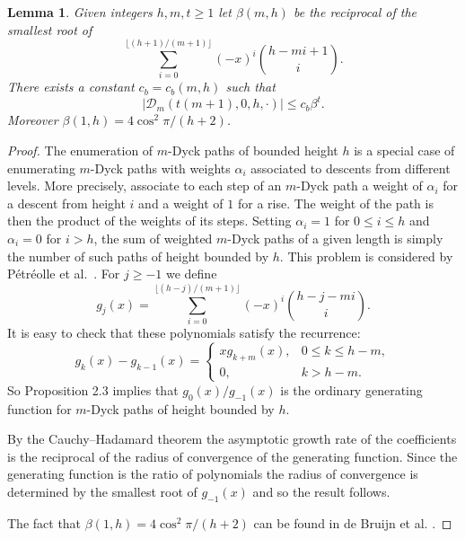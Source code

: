 \documentclass[12]{article}
\newtheorem{lem}[thm]{Lemma}
\begin{document}
\begin{lem}\label{bound2:lem}
  Given integers $h,m,t\geq 1$ let $\beta(m,h)$ be the reciprocal of the smallest root of \[\sum_{i=0}^{\lfloor (h+1)/(m+1)\rfloor} (-x)^i\binom{h-mi+1}{i}.\] There exists a constant $c_b=c_b(m,h)$ such that
  \[|\mathcal{D}_m(t(m+1),0,h,\cdot)|\leq c_b\beta^{t}.\]
Moreover $\beta(1,h)=4\cos^2\pi/(h+2)$.
\end{lem}
\begin{proof} The enumeration of $m$-Dyck paths of bounded height $h$ is a special case of enumerating $m$-Dyck paths with weights $\alpha_i$ associated to descents from different levels. More precisely, associate to each step of an $m$-Dyck path a weight of $\alpha_i$ for a descent from height $i$ and a weight of $1$ for a rise. The weight of the path is then the product of the weights of its steps. Setting $\alpha_i=1$ for $0\leq i\leq h$ and $\alpha_i=0$ for $i>h$, the sum of weighted $m$-Dyck paths of a given length is simply the number of such paths of height bounded by $h$. This problem is considered by P\'etr\'eolle et al.~\cite{petreolle2018lattice}. For $j\geq -1$ we define\[
  g_{j}(x)=\sum_{i=0}^{\lfloor(h-j)/(m+1)\rfloor}(-x)^i\binom{h-j-mi}{i}.\]
  It is easy to check that these polynomials satisfy the recurrence:\[
  g_k(x)-g_{k-1}(x)=\left\{\begin{array}{ll} xg_{k+m}(x),& 0\leq k\leq h-m,\\ 0, & k>h-m.\end{array}\right.\] So Proposition 2.3 \cite{petreolle2018lattice} implies that $g_0(x)/g_{-1}(x)$ is the ordinary generating function for $m$-Dyck paths of height bounded by $h$.
  
  By the Cauchy--Hadamard theorem the asymptotic growth rate of the coefficients is the reciprocal of the  radius of convergence of the generating function. Since the generating function is the ratio of polynomials the radius of convergence is determined by the smallest root of $g_{-1}(x)$ and so the result follows.

  The fact that $\beta(1,h)=4\cos^2\pi/(h+2)$ can be found in de Bruijn et al. \cite{BKR}.
\end{proof} 
\end{document}

